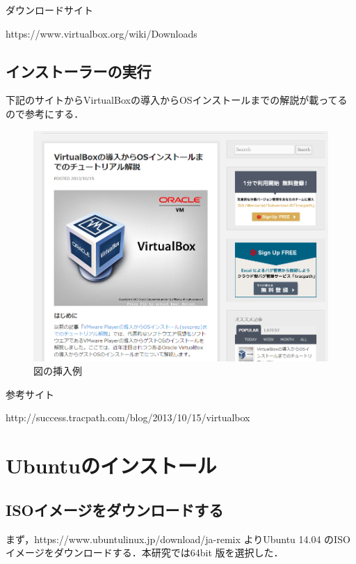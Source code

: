 ダウンロードサイト

https://www.virtualbox.org/wiki/Downloads


\subsection{インストーラーの実行}

下記のサイトからVirtualBoxの導入からOSインストールまでの解説が載ってるので参考にする．

\begin{figure}[H]
\centering
\includegraphics[width=13cm]{sample12.png}
\caption{図の挿入例}\label{サンプル図}
\end{figure}

参考サイト

http://success.tracpath.com/blog/2013/10/15/virtualbox%


\section{Ubuntuのインストール}

\subsection{ISOイメージをダウンロードする}

まず，https://www.ubuntulinux.jp/download/ja-remix よりUbuntu 14.04 のISO イメージをダウンロードする．本研究では64bit 版を選択した．




